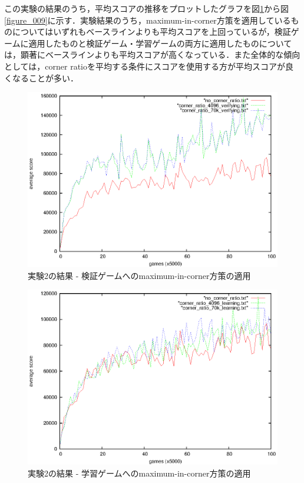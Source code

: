\documentclass{suribt}
\begin{document}
この実験の結果のうち，平均スコアの推移をプロットしたグラフを図\ref{figure_007}から図\ref{figure_009}に示す．実験結果のうち，maximum-in-corner方策を適用しているものについてはいずれもベースラインよりも平均スコアを上回っているが，検証ゲームに適用したものと検証ゲーム・学習ゲームの両方に適用したものについては，顕著にベースラインよりも平均スコアが高くなっている．また全体的な傾向としては，corner ratioを平均する条件にスコアを使用する方が平均スコアが良くなることが多い．

\begin{figure}[tb]
	\begin{center}
	\includegraphics[width=13cm]{figure_007.eps}
	\caption{実験2の結果 - 検証ゲームへのmaximum-in-corner方策の適用}
	\label{figure_007}
	\end{center}
\end{figure}

\begin{figure}[tb]
	\begin{center}
	\includegraphics[width=13cm]{figure_008.eps}
	\caption{実験2の結果 - 学習ゲームへのmaximum-in-corner方策の適用}
	\label{figure_008}
	\end{center}
\end{figure}
\end{document}
